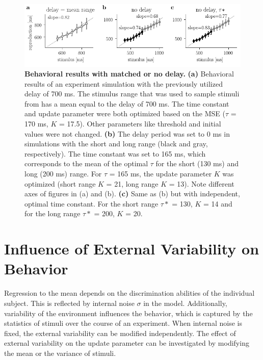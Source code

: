 \documentclass[10pt]{article}
\begin{document}
\begin{figure}[ht]
	\centering
	\includegraphics{figures/delay.pdf}
	\caption{\textbf{Behavioral results with matched or no delay.} 
	\textbf{(a)} Behavioral results of an experiment simulation with the previously utilized delay of 700 ms. The stimulus range that was used to sample stimuli from has a mean equal to the delay of 700 ms. The time constant and update parameter were both optimized based on the MSE ($\tau$ = 170 ms, $K$ = 17.5). Other parameters like threshold and initial values were not changed. 
	\textbf{(b)} The delay period was set to 0 ms in simulations with the short and long range (black and gray, respectively). The time constant was set to 165 ms, which corresponds to the mean of the optimal $\tau$ for the short (130 ms) and long (200 ms) range. For $\tau$ = 165 ms, the update parameter $K$ was optimized (short range $K$ = 21, long range $K$ = 13). Note different axes of figures in (a) and (b).
	\textbf{(c)} Same as (b) but with independent, optimal time constant. For the short range $\tau*$ = 130, $K$ = 14 and for the long range $\tau*$ = 200, $K$ = 20.
	}
\label{fig:delay}
\end{figure}


\section{Influence of External Variability on Behavior} \label{externalvar}
Regression to the mean depends on the discrimination abilities of the individual subject. This is reflected by internal noise $\sigma$ in the model.
Additionally, variability of the environment influences the behavior, which is captured  by the statistics of stimuli over the course of an experiment. 
When internal noise is fixed, the external variability can be modified independently. 
The effect of external variability on the update parameter can be investigated by modifying the mean or the variance of stimuli. 
\end{document}
